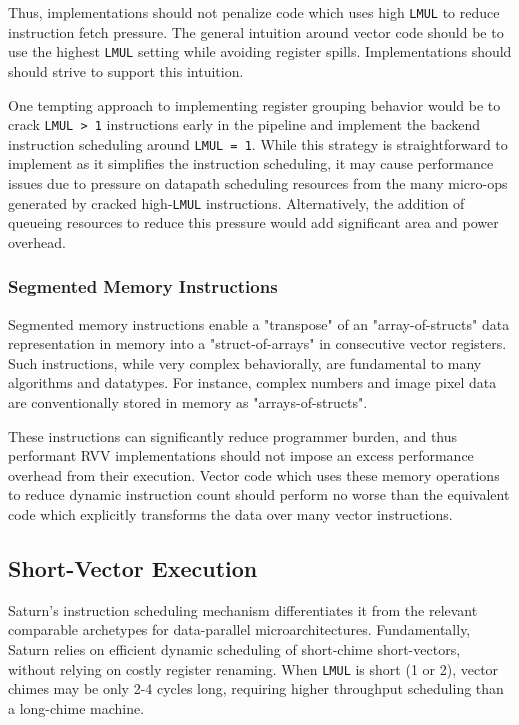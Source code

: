 Thus, implementations should not penalize code which uses high \texttt{LMUL} to reduce instruction fetch pressure.
The general intuition around vector code should be to use the highest \texttt{LMUL} setting while avoiding register spills.
Implementations should should strive to support this intuition.

One tempting approach to implementing register grouping behavior would be to crack \texttt{LMUL > 1} instructions early in the pipeline and implement the backend instruction scheduling around \texttt{LMUL = 1}.
While this strategy is straightforward to implement as it simplifies the instruction scheduling, it may cause performance issues due to pressure on datapath scheduling resources from the many micro-ops generated by cracked high-\texttt{LMUL} instructions.
Alternatively, the addition of queueing resources to reduce this pressure would add significant area and power overhead.


\subsubsection{Segmented Memory Instructions}

Segmented memory instructions enable a "transpose" of an "array-of-structs" data representation in memory into a "struct-of-arrays" in consecutive vector registers.
Such instructions, while very complex behaviorally, are fundamental to many algorithms and datatypes.
For instance, complex numbers and image pixel data are conventionally stored in memory as "arrays-of-structs".

These instructions can significantly reduce programmer burden, and thus performant RVV implementations should not impose an excess performance overhead from their execution.
Vector code which uses these memory operations to reduce dynamic instruction count should perform no worse than the equivalent code which explicitly transforms the data over many vector instructions.

\newpage
\subsection{Short-Vector Execution}

Saturn's instruction scheduling mechanism differentiates it from the relevant comparable archetypes for data-parallel microarchitectures.
Fundamentally, Saturn relies on efficient dynamic scheduling of short-chime short-vectors, without relying on costly register renaming.
When \texttt{LMUL} is short (1 or 2), vector chimes may be only 2-4 cycles long, requiring higher throughput scheduling than a long-chime machine.

